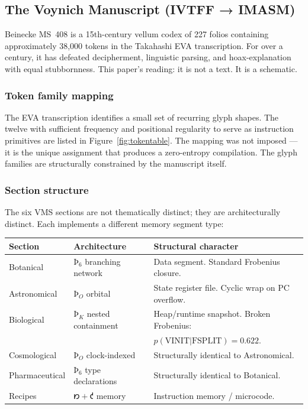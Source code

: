 \documentclass[12pt,a4paper]{article}
\begin{document}
\subsection{The Voynich Manuscript (IVTFF → IMASM)}

Beinecke MS~408 is a 15th-century vellum codex of 227 folios containing approximately 38,000 tokens in the Takahashi EVA transcription. For over a century, it has defeated decipherment, linguistic parsing, and hoax-explanation with equal stubbornness. This paper's reading: it is not a text. It is a schematic.

\subsubsection{Token family mapping}

The EVA transcription identifies a small set of recurring glyph shapes. The twelve with sufficient frequency and positional regularity to serve as instruction primitives are listed in Figure~\ref{fig:tokentable}. The mapping was not imposed --- it is the unique assignment that produces a zero-entropy compilation. The glyph families are structurally constrained by the manuscript itself.

\subsubsection{Section structure}

The six VMS sections are not thematically distinct; they are architecturally distinct. Each implements a different memory segment type:

\begin{center}
\small
\begin{tabular}{lll}
\toprule
Section & Architecture & Structural character \\
\midrule
Botanical    & $\text{Þ}_6$ branching network & Data segment. Standard Frobenius closure. \\
Astronomical & $\text{Þ}_O$ orbital           & State register file. Cyclic wrap on PC overflow. \\
Biological   & $\text{Þ}_K$ nested containment & Heap/runtime snapshot. Broken Frobenius: \\
             &                                  & $p(\text{VINIT}|\text{FSPLIT}) = 0.622$. \\
Cosmological & $\text{Þ}_O$ clock-indexed      & Structurally identical to Astronomical. \\
Pharmaceutical & $\text{Þ}_6$ type declarations & Structurally identical to Botanical. \\
Recipes      & $𐑽 + 𐑒$ memory & Instruction memory / microcode. \\
\bottomrule
\end{tabular}
\end{center}
\end{document}

